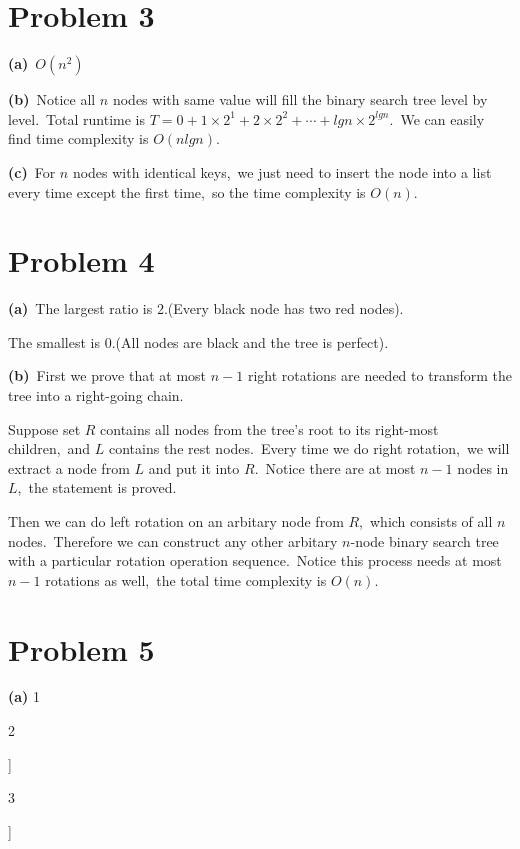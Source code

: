 \documentclass[]{article}
\begin{document}
	\section{Problem 3}
	\textbf{(a)}\ $O(n^2)$
	
	\textbf{(b)}\ Notice all $n$ nodes with same value will fill the binary search tree level by level.\ Total runtime is $T = 0 + 1\times 2^1 + 2\times 2^2 + \cdots + lgn\times 2^{lgn}$.\ We can easily find time complexity is $O(nlgn)$.
	
	\textbf{(c)}\ For $n$ nodes with identical keys,\ we just need to insert the node into a list every time except the first time,\ so the time complexity is $O(n)$.
	
	\section{Problem 4}
	\textbf{(a)}\ The largest ratio is $2$.(Every black node has two red nodes).
	
	The smallest is $0$.(All nodes are black and the tree is perfect).
	
	\textbf{(b)}\ First we prove that at most $n - 1$ right rotations are needed to transform the tree into a right-going chain.
	
	Suppose set $R$ contains all nodes from the tree's root to its right-most children,\ and $L$ contains the rest nodes.\ Every time we do right rotation,\ we will extract a node from $L$ and put it into $R$.\ Notice there are at most $n-1$ nodes in $L$,\ the statement is proved.
	
	Then we can do left rotation on an arbitary node from $R$,\ which consists of all $n$ nodes.\ Therefore we can construct any other arbitary $n$-node binary search tree with a particular rotation operation sequence.\ Notice this process needs at most $n-1$ rotations as well,\ the total time complexity is $O(n)$.
	
	\section{Problem 5}
	\textbf{(a)}
	\textcircled{1}
	\begin{forest}
		[$41(B)$]		
	\end{forest}
	\textcircled{2}
	\begin{forest}
		[$41(B)$
			[$38(R)$]
			[]
		]
	\end{forest}
	\textcircled{3}
	\begin{forest}
		[$38(B)$
			[$31(R)$]
			[$41(R)$]		
		]
	\end{forest}
	
\end{document}
